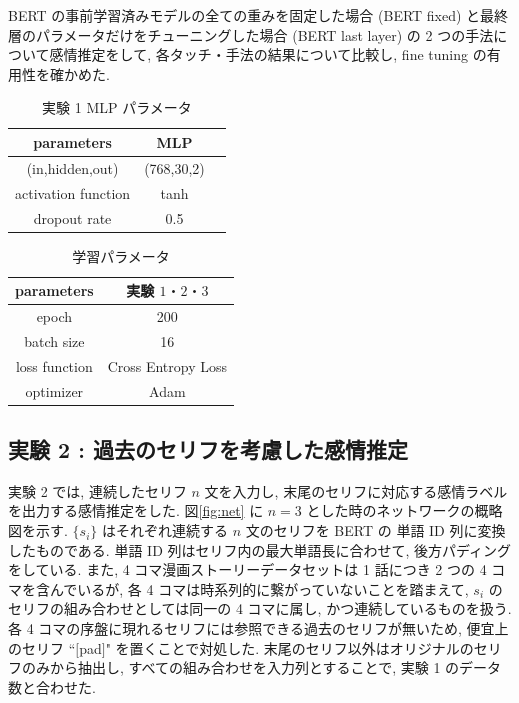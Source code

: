 \documentclass[twocolumn]{jarticle}     %
\begin{document}
BERT の事前学習済みモデルの全ての重みを固定した場合 (BERT fixed) と最終層のパラメータだけをチューニングした場合 (BERT last layer) の 2 つの手法について感情推定をして, 各タッチ・手法の結果について比較し, fine tuning の有用性を確かめた.

\begin{table}[htb]
\caption{実験 1 MLP パラメータ}
\label{table:mlp_para}
\centering
\begin{tabular}{|c||c|c|}
\hline
parameters & MLP \\ \hline
(in,hidden,out) & (768,30,2) \\ \hline
activation function & tanh \\ \hline
dropout rate & 0.5 \\ \hline
\end{tabular}
\end{table}

\begin{table}[htb]
\caption{学習パラメータ}
\label{table:ex_para}
\centering
\begin{tabular}{|c||c|c|}
\hline
parameters & \multicolumn{2}{|c|}{実験 $1・2・3$} \\ \hline
epoch & \multicolumn{2}{|c|}{200}  \\ \hline
batch size & \multicolumn{2}{|c|}{16} \\ \hline
loss function & \multicolumn{2}{|c|}{Cross Entropy Loss} \\ \hline
optimizer & \multicolumn{2}{|c|}{Adam} \\ \hline
\end{tabular}
\end{table}

\newpage

\subsection{\small{実験 2 : 過去のセリフを考慮した感情推定}}
実験 2 では, 連続したセリフ $n$ 文を入力し, 末尾のセリフに対応する感情ラベルを出力する感情推定をした.
図\ref{fig:net} に $n = 3$ とした時のネットワークの概略図を示す. $\{s_i\}$ はそれぞれ連続する $n$ 文のセリフを BERT の 単語 ID 列に変換したものである. 単語 ID 列はセリフ内の最大単語長に合わせて, 後方パディングをしている. また, 4 コマ漫画ストーリーデータセットは 1 話につき 2 つの 4 コマを含んでいるが, 各 4 コマは時系列的に繋がっていないことを踏まえて, ${s_i}$ のセリフの組み合わせとしては同一の 4 コマに属し, かつ連続しているものを扱う. 各 4 コマの序盤に現れるセリフには参照できる過去のセリフが無いため, 便宜上のセリフ ``$[$pad$]$" を置くことで対処した. 末尾のセリフ以外はオリジナルのセリフのみから抽出し, すべての組み合わせを入力列とすることで, 実験 1 のデータ数と合わせた.
\end{document}
